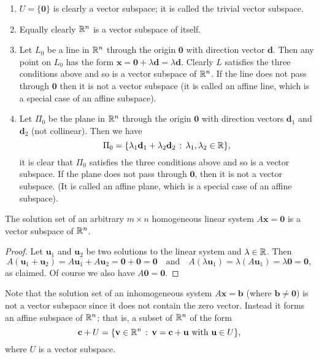 \documentclass[10pt, a4paper]{article}
\newcommand{\mbf}[1]{\mathbf{#1}}
\begin{document}
\begin{example}
    \begin{enumerate}[label = (\roman*)]
        \item  $U = \{\mbf{0}\}$ is clearly a vector subspace;
        it is called the trivial vector subspace.
        \item Equally clearly $\mathbb{R} ^ n$ is a vector subspace of itself.
        \item Let $L_0$ be a line in $\mathbb{R} ^ n$ through the origin $\mbf{0}$ with direction vector $\mbf{d}$.
        Then any point on $L_0$ has the form $\mbf{x} = \mbf{0} + \lambda\mbf{d} = \lambda\mbf{d}$.
        Clearly $L$ satisfies the three conditions above and so is a vector subspace of $\mathbb{R} ^ n$.
        If the line does not pass through $\mbf{0}$ then it is not a vector subspace
        (it is called an affine line,
        which is a special case of an affine subspace).
        \item Let $\Pi_0$ be the plane in $\mathbb{R} ^ n$ through the origin $\mbf{0}$ with direction vectors $\mbf{d}_1$ and $\mbf{d}_2$ (not collinear).
        Then we have
        \[
        \Pi_0 = \{\lambda_1\mbf{d}_1 + \lambda_2\mbf{d}_2\,:\, \lambda_1, \lambda_2 \in \R\},
        \]
        it is clear that $\Pi_0$ satisfies the three conditions above and so is a vector subspace.
        If the plane does not pass through $\mbf{0}$,
        then it is not a vector subspace.
        (It is called an affine plane,
        which is a special case of an affine subspace).
    \end{enumerate}
\end{example}

\begin{proposition}
    The solution set of an arbitrary $m \times n$ homogeneous linear system $A\mbf{x} = \mbf{0}$ is a vector subspace of $\mathbb{R} ^ n$.
    \begin{proof}
        Let $\mbf{u}_1$ and $\mbf{u}_2$ be two solutions to the linear system and $\lambda \in \mathbb{R}$.
        Then
        \[
        A(\mbf{u}_1 + \mbf{u}_2) = A\mbf{u}_1 + A\mbf{u}_2 = \mbf{0} + \mbf{0} = \mbf{0}\quad\text{and}\quad A(\lambda\mbf{u}_1) = \lambda(A\mbf{u}_1) = \lambda\mbf{0} = \mbf{0},
        \]
        as claimed.
        Of course we also have $A\mbf{0} = \mbf{0}$.
    \end{proof}
\end{proposition}

Note that the solution set of an inhomogeneous system $A\mbf{x} = \mbf{b}$
(where $\mbf{b} \neq \mbf{0}$)
is not a vector subspace since it does not contain the zero vector.
Instead it forms an affine subspace of $\mathbb{R} ^ n$;
that is,
a subset of $\mathbb{R} ^ n$ of the form
\[
\mbf{c} + U = \{\mbf{v} \in \R ^ n\,:\,\mbf{v} = \mbf{c} + \mbf{u}\text{ with }\mbf{u} \in U\},
\]
where $U$ is a vector subspace.
\end{document}
